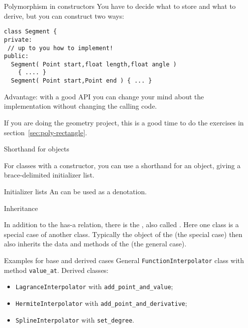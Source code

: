 \begin{slide}{Polymorphism in constructors}
  \label{sl:obj-poly-construct}
  You have to decide what to store and what to derive, but you can
  construct two ways:
  \lstset{style=snippetcode}
\begin{lstlisting}
class Segment {
private:
 // up to you how to implement!
public:
  Segment( Point start,float length,float angle )
    { .... }
  Segment( Point start,Point end ) { ... }
\end{lstlisting}
Advantage: with a good API you can change your mind about the
implementation without changing the calling code.
\end{slide}

\begin{exercise}
  If you are doing the geometry project, this is a good time to
  do the exercises in section~\ref{sec:poly-rectangle}.
\end{exercise}

 {Shorthand for objects}

For classes with a constructor, you can use a shorthand
for an object, giving a brace-delimited initializer list.

\begin{block}{Initializer lists}
  \label{sl:class-inlist}
  An  can be used as a denotation.
\end{block}

 {Inheritance}
\label{sec:inheritance}

In addition to the has-a relation, there is the , also called . Here one class is
a special case of another class.
Typically the object of the  (the special
case) then also inherits the data and methods of the
 (the general case).

\begin{block}{Examples for base and derived cases}
  \label{sl:derived-example}
  General \lstinline{FunctionInterpolator} class with method \lstinline{value_at}.
  Derived classes:
  \begin{itemize}
  \item \lstinline{LagranceInterpolator} with \lstinline{add_point_and_value};
  \item \lstinline{HermiteInterpolator} with \lstinline{add_point_and_derivative};
  \item \lstinline{SplineInterpolator} with \lstinline{set_degree}.
  \end{itemize}
\end{block}

